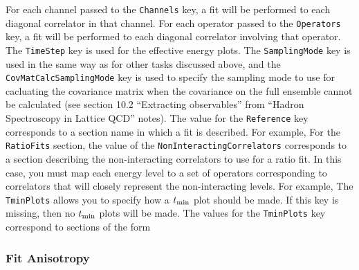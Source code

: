 \documentclass[12pt,letterpaper,notitlepage]{article}
\newcommand{\key}[1]{\textcolor{Emerald}{\texttt{\small{#1}}}}
\begin{document}
For each channel passed to the \key{Channels} key, a fit will be performed to each diagonal correlator in that channel.
For each operator passed to the \key{Operators} key, a fit will be performed to each diagonal correlator involving that operator.
The \key{TimeStep} key is used for the effective energy plots.
The \key{SamplingMode} key is used in the same way as for other tasks discussed above,
and the \key{CovMatCalcSamplingMode} key is used to specify the sampling mode to use for cacluating the covariance matrix when the covariance on the full ensemble cannot be calculated
(see section 10.2 ``Extracting observables'' from ``Hadron Spectroscopy in Lattice QCD'' notes).
The value for the \key{Reference} key corresponds to a section name in which a fit is described.
For example,
For the \key{RatioFits} section, the value of the \key{NonInteractingCorrelators} corresponds to a section describing the non-interacting correlators to use for a ratio fit.
In this case, you must map each energy level to a set of operators corresponding to correlators that will closely represent the non-interacting levels.
For example,
The \key{TminPlots} allows you to specify how a $t_{\rm min}$ plot should be made.
If this key is missing, then no $t_{\rm min}$ plots will be made.
The values for the \key{TminPlots} key correspond to sections of the form

\subsubsection{Fit Anisotropy}
\end{document}
